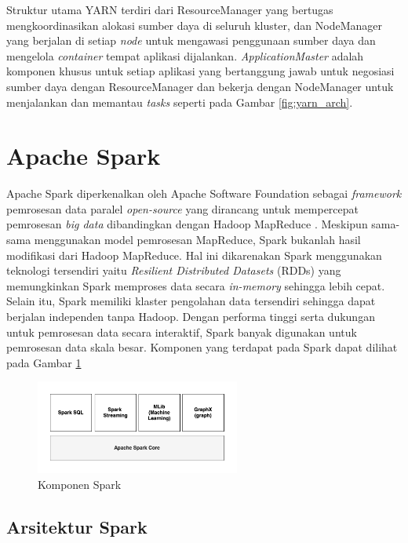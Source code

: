 Struktur utama YARN terdiri dari ResourceManager yang bertugas mengkoordinasikan alokasi sumber daya di seluruh kluster, dan NodeManager yang berjalan di setiap \textit{node} untuk mengawasi penggunaan sumber daya dan mengelola \textit{container} tempat aplikasi dijalankan. \textit{ApplicationMaster} adalah komponen khusus untuk setiap aplikasi yang bertanggung jawab untuk negosiasi sumber daya dengan ResourceManager dan bekerja dengan NodeManager untuk menjalankan dan memantau \textit{tasks} seperti pada Gambar \ref{fig:yarn_arch}.

\section{Apache Spark}
Apache Spark diperkenalkan oleh Apache Software Foundation sebagai \textit{framework} pemrosesan data paralel \textit{open-source} yang dirancang untuk mempercepat pemrosesan \textit{big data} dibandingkan dengan  Hadoop MapReduce \cite{ApacheSparkUnified}. Meskipun sama-sama menggunakan model pemrosesan MapReduce, Spark bukanlah hasil modifikasi dari Hadoop MapReduce\cite{KOMPARASIKECEPATANHADOOP}. Hal ini dikarenakan Spark menggunakan teknologi tersendiri yaitu \textit{Resilient Distributed Datasets} (RDDs) yang memungkinkan Spark memproses data secara \textit{in-memory} sehingga lebih cepat. Selain itu, Spark memiliki klaster pengolahan data tersendiri sehingga dapat berjalan independen tanpa Hadoop. Dengan performa tinggi serta dukungan untuk pemrosesan data secara interaktif, Spark banyak digunakan untuk pemrosesan data skala besar. Komponen yang terdapat pada Spark dapat dilihat pada Gambar \ref{fig:spark-component}

\begin{figure}[h]
    \centering
    \includegraphics[width=0.6\textwidth]{figures/ch02/spark-contain}
    \caption{Komponen Spark}
    \label{fig:spark-component}
\end{figure}

\subsection{Arsitektur Spark}

